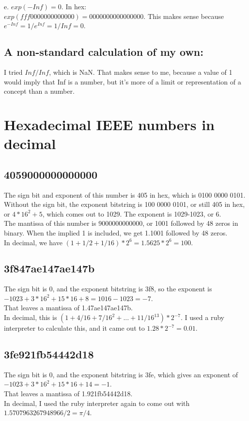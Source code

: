 \documentclass[11pt]{modart}
\begin{document}
e. $exp(-Inf) = 0$.  In hex:\\
$exp(fff0000000000000) = 0000000000000000$.  This makes sense because $e^{-Inf} = 1/e^{Inf} = 1/Inf = 0$.

\subsection{A non-standard calculation of my own:}
I tried $Inf/Inf$, which is NaN.  That makes sense to me, because a value of 1 would imply that Inf is a number, but it's more of a limit or representation of a concept than a number.

\section{Hexadecimal IEEE numbers in decimal}
\subsection{4059000000000000}
The sign bit and exponent of this number is 405 in hex, which is 0100 0000 0101.  Without the sign bit, the exponent bitstring is 100 0000 0101, or still 405 in hex, or $4*16^2 + 5$, which comes out to 1029.  The exponent is 1029-1023, or 6.\\
The mantissa of this number is 9000000000000, or 1001 followed by 48 zeros in binary.  When the implied 1 is included, we get 1.1001 followed by 48 zeros.\\
In decimal, we have $(1 + 1/2 + 1/16) * 2^6=1.5625*2^6=100$.
\subsection{3f847ae147ae147b}
The sign bit is 0, and the exponent bitstring is 3f8, so the exponent is $-1023 + 3*16^2 + 15*16 + 8=1016-1023 = -7$.\\
That leaves a mantissa of 1.47ae147ae147b. \\
In decimal, this is $(1 + 4/16 + 7/16^2 + ... + 11/16^{13})*2^{-7}$.  I used a ruby interpreter to calculate this,
and it came out to $1.28*2^{-7} = 0.01$.
\subsection{3fe921fb54442d18}
The sign bit is 0, and the exponent bitstring is 3fe, which gives an exponent of $-1023 + 3*16^2 + 15*16 + 14 = -1$.\\
That leaves a mantissa of 1.921fb54442d18.\\
In decimal, I used the ruby interpreter again to come out with $1.5707963267948966/2=\pi/4$.
\end{document}

